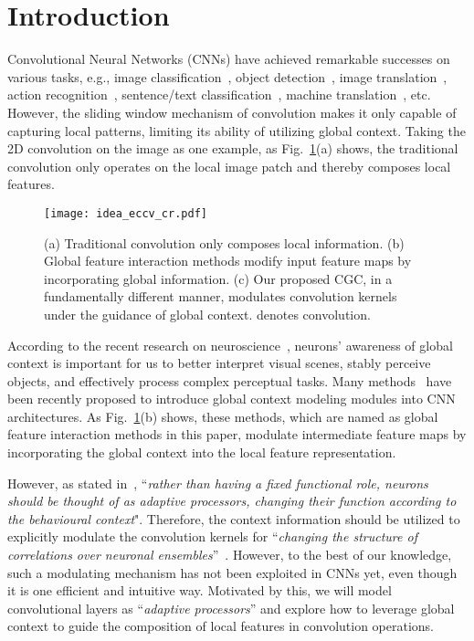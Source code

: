 \documentclass[runningheads]{llncs}
\begin{document}
\section{Introduction}



Convolutional Neural Networks (CNNs) have achieved remarkable successes on various tasks, e.g., image classification~\cite{He_2016_CVPR,huang2017densely}, object detection~\cite{rcnn,fasterrcnn}, image translation~\cite{CycleGAN2017}, action recognition~\cite{Kinetics}, sentence/text classification~\cite{zhang2015character,kim2014convolutional}, machine translation~\cite{gehring2017convolutional}, etc. However, the sliding window mechanism of convolution makes it only capable of capturing local patterns, limiting its ability of utilizing global context. Taking the 2D convolution on the image as one example, as Fig.~\ref{idea}(a) shows, the traditional convolution only operates on the local image patch and thereby composes local features.

\begin{figure}
    \centering
    \texttt{[image: idea\_eccv\_cr.pdf]}
    \caption{(a) Traditional convolution only composes local information. (b) Global feature interaction methods modify input feature maps by incorporating global information. (c) Our proposed CGC, in a fundamentally different manner, modulates convolution kernels under the guidance of global context.  denotes convolution.}\label{idea}
\end{figure}



According to the recent research on neuroscience~\cite{li2004perceptual,gilbert2013top}, neurons' awareness of global context is important for us to better interpret visual scenes, stably perceive objects, and effectively process complex perceptual tasks. Many methods~\cite{vaswani2017attention,wang2017residual,wang2017non,park2018bam,hu2018squeeze,chen2019graph,cao2019gcnet,bello2019attention,li2019selective} have been recently proposed to introduce global context modeling modules into CNN architectures. As Fig.~\ref{idea}(b) shows, these methods, which are named as global feature interaction methods in this paper, modulate intermediate feature maps by incorporating the global context into the local feature representation. 


However, as stated in~\cite{gilbert2013top}, ``\textit{rather than having a fixed functional role, neurons should be thought of as adaptive processors, changing their function according to the behavioural context}". Therefore, the context information should be utilized to explicitly modulate the convolution kernels for ``\textit{changing the structure of correlations over neuronal ensembles}''~\cite{gilbert2013top}. However, to the best of our knowledge, such a modulating mechanism has not been exploited in CNNs yet, even though it is one efficient and intuitive way. 
Motivated by this, we will model convolutional layers as ``\textit{adaptive processors}'' and explore how to leverage global context to guide the composition of local features in convolution operations.
\end{document}
